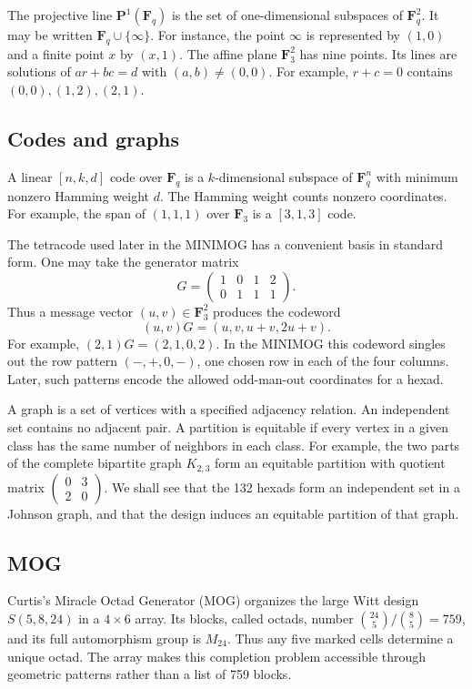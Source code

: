 \documentclass[12pt,letterpaper]{article}
\theoremstyle{definition}\newtheorem{example}[theorem]{Example}
\numberwithin{equation}{section}
\newcommand{\F}{\mathbf F}
\begin{document}
The projective line $\mathbf P^1(\F_q)$ is the set of one-dimensional subspaces of $\F_q^2$. It may be written $\F_q\cup\{\infty\}$. For instance, the point $\infty$ is represented by $(1,0)$ and a finite point $x$ by $(x,1)$. The affine plane $\F_3^2$ has nine points. Its lines are solutions of $ar+bc=d$ with $(a,b)\ne(0,0)$. For example, $r+c=0$ contains $(0,0),(1,2),(2,1)$.

\subsection{Codes and graphs}
A linear $[n,k,d]$ code over $\F_q$ is a $k$-dimensional subspace of $\F_q^n$ with minimum nonzero Hamming weight $d$. The Hamming weight counts nonzero coordinates. For example, the span of $(1,1,1)$ over $\F_3$ is a $[3,1,3]$ code.

The tetracode used later in the MINIMOG has a convenient basis in standard form. One may take the generator matrix
\begin{equation}\label{eq:tetrastandard}
G=\begin{pmatrix}1&0&1&2\\0&1&1&1\end{pmatrix}.
\end{equation}
Thus a message vector $(u,v)\in\F_3^2$ produces the codeword
\[
(u,v)G=(u,v,u+v,2u+v).
\]
For example, $(2,1)G=(2,1,0,2)$. In the MINIMOG this codeword singles out the row pattern $(-,+,0,-)$, one chosen row in each of the four columns. Later, such patterns encode the allowed odd-man-out coordinates for a hexad.

A graph is a set of vertices with a specified adjacency relation. An independent set contains no adjacent pair. A partition is equitable if every vertex in a given class has the same number of neighbors in each class. For example, the two parts of the complete bipartite graph $K_{2,3}$ form an equitable partition with quotient matrix $\left(\begin{smallmatrix}0&3\\2&0\end{smallmatrix}\right)$. We shall see that the 132 hexads form an independent set in a Johnson graph, and that the design induces an equitable partition of that graph.

\subsection{MOG}\label{sec:mog}
Curtis's Miracle Octad Generator (MOG) \cite{Cu76} organizes the large Witt design $S(5,8,24)$ in a $4\times6$ array. Its blocks, called octads, number $\binom{24}{5}/\binom{8}{5}=759$, and its full automorphism group is $M_{24}$. Thus any five marked cells determine a unique octad. The array makes this completion problem accessible through geometric patterns rather than a list of 759 blocks.
\end{document}
